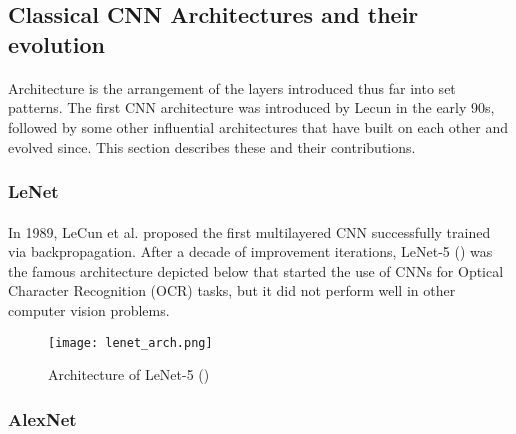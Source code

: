 \subsection{Classical \gls{CNN} Architectures and their evolution} \label{classic_cnn}
\paragraph{}
Architecture is the arrangement of the layers introduced thus far into set patterns. The first \gls{CNN} architecture was introduced by Lecun in the early 90s, followed by some other influential architectures that have built on each other and evolved since. This section describes these and their contributions.

\subsubsection{LeNet}
\paragraph{}
In 1989, LeCun et al. proposed the first multilayered \gls{CNN} successfully trained via backpropagation. After a decade of improvement iterations, LeNet-5 (\cite{726791}) was the famous architecture depicted below that started the use of \gls{CNN}s for Optical Character Recognition (OCR) tasks, but it did not perform well in other computer vision problems.

    \begin{figure}[hbt!]
        \centering
        \texttt{[image: lenet\_arch.png]}
        \caption{Architecture of LeNet-5 (\cite{726791})}
        \label{fig_lenet}
    \end{figure}
    
\subsubsection{AlexNet}

